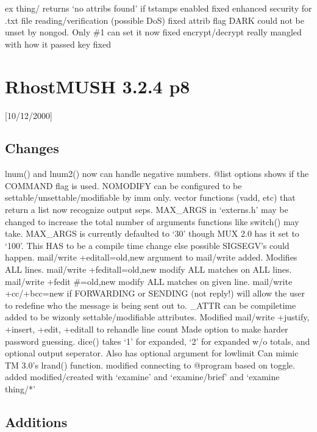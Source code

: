 \documentclass[letterpaper,10pt,english]{sphinxmanual}
\begin{document}
\sphinxAtStartPar
ex thing/ returns ‘no attribs found’ if tstamps enabled \sphinxhyphen{} fixed
enhanced security for .txt file reading/verification (possible DoS) \sphinxhyphen{} fixed
attrib flag DARK could not be unset by non\sphinxhyphen{}god.  Only \#1 can set it now \sphinxhyphen{} fixed
encrypt/decrypt really mangled with how it passed key \sphinxhyphen{} fixed


\section{RhostMUSH 3.2.4 p8}
\label{\detokenize{changelog:rhostmush-3-2-4-p8}}\label{\detokenize{changelog:changelog-3-2-4p8}}
\sphinxAtStartPar
{[}10/12/2000{]}


\subsection{Changes}
\label{\detokenize{changelog:id59}}
\sphinxAtStartPar
lnum() and lnum2() now can handle negative numbers.
@list options shows if the COMMAND flag is used.
NOMODIFY can be configured to be settable/unsettable/modifiable by imm only.
vector functions (vadd, etc) that return a list now recognize output seps.
MAX\_ARGS in ‘externs.h’ may be changed to increase the total number of arguments functions like switch() may take.  MAX\_ARGS is currently defaulted to ‘30’ though MUX 2.0 has it set to ‘100’.  This HAS to be a compile time change else possible SIGSEGV’s could happen.
mail/write +editall=old,new \sphinxhyphen{} argument to mail/write added. Modifies ALL lines.
mail/write +feditall=old,new \sphinxhyphen{} modify ALL matches on ALL lines.
mail/write +fedit \#=old,new \sphinxhyphen{} modify ALL matches on given line.
mail/write +cc/+bcc=new \sphinxhyphen{} if FORWARDING or SENDING (not reply!) will allow the user to redefine who the message is being sent out to.
\_ATTR can be compile\sphinxhyphen{}time added to be wiz\sphinxhyphen{}only settable/modifiable attributes.
Modified mail/write +justify, +insert, +edit, +editall to rehandle line count
Made option to make harder password guessing.
dice() takes ‘1’ for expanded, ‘2’ for expanded w/o totals, and optional output seperator.  Also has optional argument for low\sphinxhyphen{}limit Can mimic TM 3.0’s lrand() function.
modified connecting to @program based on toggle.
added modified/created with ‘examine’ and ‘examine/brief’ and ‘examine thing/*’


\subsection{Additions}
\label{\detokenize{changelog:id60}}
\end{document}

